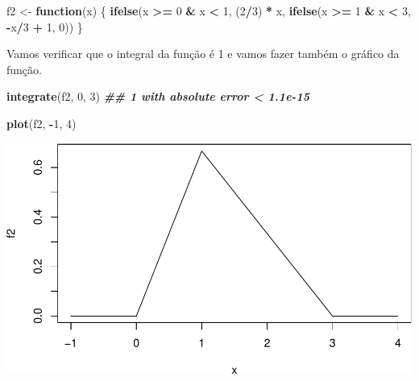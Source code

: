 \documentclass[
]{book}
\newenvironment{Shaded}{\begin{snugshade}}{\end{snugshade}}
\newcommand{\ControlFlowTok}[1]{\textcolor[rgb]{0.13,0.29,0.53}{\textbf{#1}}}
\newcommand{\DecValTok}[1]{\textcolor[rgb]{0.00,0.00,0.81}{#1}}
\newcommand{\DocumentationTok}[1]{\textcolor[rgb]{0.56,0.35,0.01}{\textbf{\textit{#1}}}}
\newcommand{\FunctionTok}[1]{\textcolor[rgb]{0.13,0.29,0.53}{\textbf{#1}}}
\newcommand{\NormalTok}[1]{#1}
\newcommand{\OtherTok}[1]{\textcolor[rgb]{0.56,0.35,0.01}{#1}}
\newcommand{\SpecialCharTok}[1]{\textcolor[rgb]{0.81,0.36,0.00}{\textbf{#1}}}
\begin{document}
\begin{Shaded}
\begin{Highlighting}[]
\NormalTok{f2 }\OtherTok{\textless{}{-}} \ControlFlowTok{function}\NormalTok{(x) \{}
  \FunctionTok{ifelse}\NormalTok{(x }\SpecialCharTok{\textgreater{}=} \DecValTok{0} \SpecialCharTok{\&}\NormalTok{ x }\SpecialCharTok{\textless{}} \DecValTok{1}\NormalTok{, (}\DecValTok{2}\SpecialCharTok{/}\DecValTok{3}\NormalTok{) }\SpecialCharTok{*}\NormalTok{ x,}
         \FunctionTok{ifelse}\NormalTok{(x }\SpecialCharTok{\textgreater{}=} \DecValTok{1} \SpecialCharTok{\&}\NormalTok{ x }\SpecialCharTok{\textless{}} \DecValTok{3}\NormalTok{, }\SpecialCharTok{{-}}\NormalTok{x}\SpecialCharTok{/}\DecValTok{3} \SpecialCharTok{+} \DecValTok{1}\NormalTok{, }\DecValTok{0}\NormalTok{))}
\NormalTok{\}}
\end{Highlighting}
\end{Shaded}

Vamos verificar que o integral da função é 1 e vamos fazer também o gráfico da função.

\begin{Shaded}
\begin{Highlighting}[]
\FunctionTok{integrate}\NormalTok{(f2, }\DecValTok{0}\NormalTok{, }\DecValTok{3}\NormalTok{)}
\DocumentationTok{\#\# 1 with absolute error \textless{} 1.1e{-}15}
\end{Highlighting}
\end{Shaded}

\begin{Shaded}
\begin{Highlighting}[]
\FunctionTok{plot}\NormalTok{(f2, }\SpecialCharTok{{-}}\DecValTok{1}\NormalTok{, }\DecValTok{4}\NormalTok{)}
\end{Highlighting}
\end{Shaded}

\includegraphics{introR_files/figure-latex/unnamed-chunk-240-1.pdf}
\end{document}
